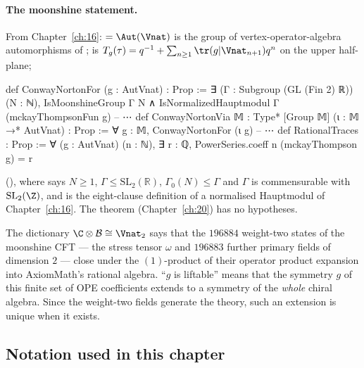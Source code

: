 \paragraph{The moonshine statement.}  From Chapter~\ref{ch:16}:  $=\Aut(\Vnat)$ is the group of
vertex-operator-algebra automorphisms of ;  is
$T_g(\tau)=q^{-1}+\sum_{n\ge1}\tr(g|\Vnat_{n+1})q^n$ on the upper half-plane;
\begin{leancode}
def ConwayNortonFor (g : AutVnat) : Prop :=
  ∃ (Γ : Subgroup (GL (Fin 2) ℝ)) (N : ℕ), IsMoonshineGroup Γ N ∧
    IsNormalizedHauptmodul Γ (mckayThompsonFun g)
-- ⋯
def ConwayNortonVia {𝕄 : Type*} [Group 𝕄] (ι : 𝕄 →* AutVnat) : Prop :=
  ∀ g : 𝕄, ConwayNortonFor (ι g)
-- ⋯
def RationalTraces : Prop :=
  ∀ (g : AutVnat) (n : ℕ), ∃ r : ℚ, PowerSeries.coeff n (mckayThompson g) = r
\end{leancode}
(), where  says $N\ge1$,
$\Gamma\le\mathrm{SL}_2(\mathbb{R})$, $\Gamma_0(N)\le\Gamma$ and $\Gamma$ is commensurable with $\mathrm{SL}_2(\Z)$, and
 is the eight-clause definition of a normalised Hauptmodul of
Chapter~\ref{ch:16}.  The theorem  (Chapter~\ref{ch:20})
has no hypotheses.

\begin{physics}
The dictionary $\C\otimes\chtwentytwoB\cong\Vnat_2$ says that the $196884$ weight-two states of the moonshine CFT
--- the stress tensor $\omega$ and $196883$ further primary fields of dimension $2$ --- close under the
$(1)$-product of their operator product expansion into AxiomMath's rational algebra.  ``$g$ is liftable'' means
that the symmetry $g$ of this finite set of OPE coefficients extends to a symmetry of the \emph{whole} chiral
algebra.  Since the weight-two fields generate the theory, such an extension is unique when it exists.
\end{physics}

\subsection{Notation used in this chapter}\label{ch22:sec:notation}

